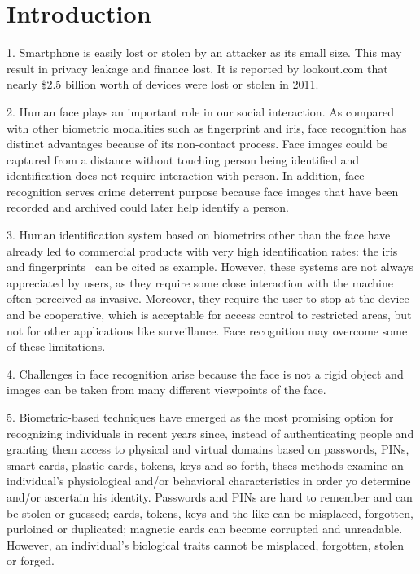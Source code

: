 \section{Introduction}
1. Smartphone is easily lost or stolen by an attacker as its small size. This may result in privacy leakage and finance lost. It is reported by lookout.com that nearly \$2.5 billion worth of devices were lost or stolen in 2011\cite{lookout-survey}.

2. Human face plays an important role in our social interaction. As compared with other biometric modalities such as fingerprint and iris, face recognition has distinct advantages because of its non-contact process. Face images could be captured from a distance without touching person being identified and identification does not require interaction with person. In addition, face recognition serves crime deterrent purpose because face images that have been recorded and archived could later help identify a person.

3. Human identification system based on biometrics other than the face have already led to commercial products with very high identification rates: the iris~\cite{daugman1993high} and fingerprints~\cite{rogers1994biometric} can be cited as example. However, these systems are not always appreciated by users, as they require some close interaction with the machine often perceived as invasive. Moreover, they require the user to stop at the device and be cooperative, which is acceptable for access control to restricted areas, but not for other applications like surveillance. Face recognition may overcome some of these limitations.

4. Challenges in face recognition arise because the face is not a rigid object and images can be taken from many different viewpoints of the face.

5. Biometric-based techniques have emerged as the most promising option for recognizing individuals in recent years since, instead of authenticating people and granting them access to physical and virtual domains based on passwords, PINs, smart cards, plastic cards, tokens, keys and so forth, thses methods examine an individual's physiological and/or behavioral characteristics in order yo determine and/or ascertain his identity. Passwords and PINs are hard to remember and can be stolen or guessed; cards, tokens, keys and the like can be misplaced, forgotten, purloined or duplicated; magnetic cards can become corrupted and unreadable. However, an individual's biological traits cannot be misplaced, forgotten, stolen or forged.

